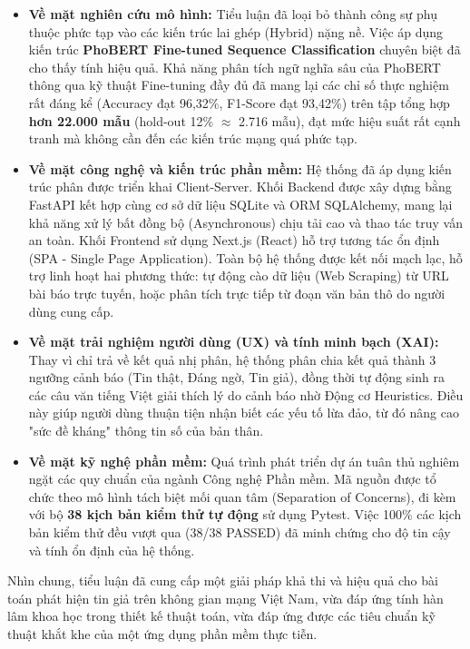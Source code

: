 \documentclass[12pt,a4paper]{article}
\begin{document}
\begin{itemize}[label={--},leftmargin=0.75cm,itemsep=3pt]
    \item \textbf{Về mặt nghiên cứu mô hình:} Tiểu luận đã loại bỏ thành công sự phụ thuộc phức tạp vào các kiến trúc lai ghép (Hybrid) nặng nề. Việc áp dụng kiến trúc \textbf{PhoBERT Fine-tuned Sequence Classification} chuyên biệt đã cho thấy tính hiệu quả. Khả năng phân tích ngữ nghĩa sâu của PhoBERT thông qua kỹ thuật Fine-tuning đầy đủ đã mang lại các chỉ số thực nghiệm rất đáng kể (Accuracy đạt 96,32\%, F1-Score đạt 93,42\%) trên tập tổng hợp \textbf{hơn 22.000 mẫu} (hold-out 12\% $\approx$ 2.716 mẫu), đạt mức hiệu suất rất cạnh tranh mà không cần đến các kiến trúc mạng quá phức tạp.
    \item \textbf{Về mặt công nghệ và kiến trúc phần mềm:} Hệ thống đã áp dụng kiến trúc phân được triển khai Client-Server. Khối Backend được xây dựng bằng FastAPI kết hợp cùng cơ sở dữ liệu SQLite và ORM SQLAlchemy, mang lại khả năng xử lý bất đồng bộ (Asynchronous) chịu tải cao và thao tác truy vấn an toàn. Khối Frontend sử dụng Next.js (React) hỗ trợ tương tác ổn định (SPA - Single Page Application). Toàn bộ hệ thống được kết nối mạch lạc, hỗ trợ linh hoạt hai phương thức: tự động cào dữ liệu (Web Scraping) từ URL bài báo trực tuyến, hoặc phân tích trực tiếp từ đoạn văn bản thô do người dùng cung cấp.
    \item \textbf{Về mặt trải nghiệm người dùng (UX) và tính minh bạch (XAI):} Thay vì chỉ trả về kết quả nhị phân, hệ thống phân chia kết quả thành 3 ngưỡng cảnh báo (Tin thật, Đáng ngờ, Tin giả), đồng thời tự động sinh ra các câu văn tiếng Việt giải thích lý do cảnh báo nhờ Động cơ Heuristics. Điều này giúp người dùng thuận tiện nhận biết các yếu tố lừa đảo, từ đó nâng cao "sức đề kháng" thông tin số của bản thân.
    \item \textbf{Về mặt kỹ nghệ phần mềm:} Quá trình phát triển dự án tuân thủ nghiêm ngặt các quy chuẩn của ngành Công nghệ Phần mềm. Mã nguồn được tổ chức theo mô hình tách biệt mối quan tâm (Separation of Concerns), đi kèm với bộ \textbf{38 kịch bản kiểm thử tự động} sử dụng Pytest. Việc 100\% các kịch bản kiểm thử đều vượt qua (38/38 PASSED) đã minh chứng cho độ tin cậy và tính ổn định của hệ thống.
\end{itemize}

Nhìn chung, tiểu luận đã cung cấp một giải pháp khả thi và hiệu quả cho bài toán phát hiện tin giả trên không gian mạng Việt Nam, vừa đáp ứng tính hàn lâm khoa học trong thiết kế thuật toán, vừa đáp ứng được các tiêu chuẩn kỹ thuật khắt khe của một ứng dụng phần mềm thực tiễn.
\end{document}
